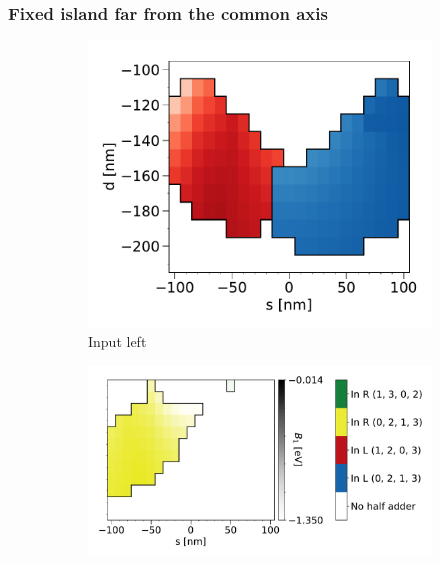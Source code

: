 \documentclass[11pt,a4paper,english]{article}
\begin{document}
\subsubsection{Fixed island far from the common axis}
\begin{figure}
    \centering
    \begin{subfigure}[t]{0.396\textwidth}
        \includegraphics[width=\textwidth]{Figures/half_adder/sweep/000006_d-s/table(d100-210_10,s-100-100_10)_balanced1.pdf}
        \caption{Input left}
    \label{fig:HalfAdder_000006_sweep_d-s_balanced1-L}
    \end{subfigure}
    \begin{subfigure}[t]{0.594\textwidth}
        \includegraphics[width=\textwidth]{Figures/half_adder/sweep/000006_d-s/table(d100-210_10,s-100-100_10)_balanced1_reversedForeground.pdf}

\end{subfigure}
\end{figure}
\end{document}
